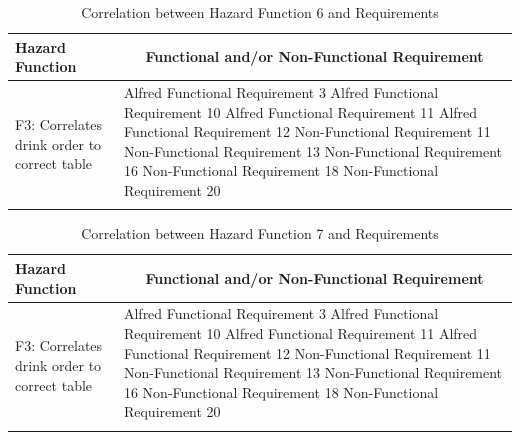 \documentclass [10pt]{article}
\begin{document}

\begin{longtable}{| p{ } | p{ } |}
\hline 
\centering \textbf{Hazard Function} & 
\multicolumn{1}{c}{\textbf {Functional and/or Non-Functional Requirement}}\\ \hline
\multirow{7}{*}{F3: Correlates drink order to correct table} & 
		{Alfred Functional Requirement 3 \newline
		Alfred Functional Requirement 10 \newline
		Alfred Functional Requirement 11 \newline
		Alfred Functional Requirement 12 \newline
		Non-Functional Requirement 11 \newline
		Non-Functional Requirement 13 \newline
		Non-Functional Requirement 16 \newline
		Non-Functional Requirement 18 \newline
		Non-Functional Requirement 20} \\ 
\hline 
\caption{Correlation between Hazard Function 6 and Requirements}  
\end{longtable}


\begin{longtable}{| p{ } | p{ } |}
\hline 
\centering \textbf{Hazard Function} & 
\multicolumn{1}{c}{\textbf {Functional and/or Non-Functional Requirement}}\\ \hline
\multirow{7}{*}{F3: Correlates drink order to correct table} & 
		{Alfred Functional Requirement 3 \newline
		Alfred Functional Requirement 10 \newline
		Alfred Functional Requirement 11 \newline
		Alfred Functional Requirement 12 \newline
		Non-Functional Requirement 11 \newline
		Non-Functional Requirement 13 \newline
		Non-Functional Requirement 16 \newline
		Non-Functional Requirement 18 \newline
		Non-Functional Requirement 20} \\ 
\hline 
\caption{Correlation between Hazard Function 7 and Requirements}  
\end{longtable}
\end{document}

